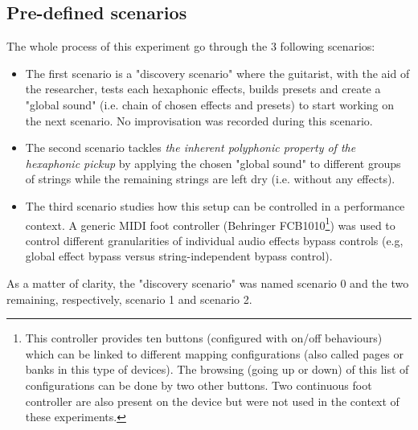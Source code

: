 \documentclass{article}
\begin{document}
\subsection{Pre-defined scenarios}
The whole process of this experiment go through the 3 following scenarios:
\begin{itemize}
    \item The first scenario is a "discovery scenario" where the guitarist, with the aid of the researcher, tests each hexaphonic effects, builds presets and create a "global sound" (i.e. chain of chosen effects and presets) to start working on the next scenario. No improvisation was recorded during this scenario.  
    
    \item The second scenario tackles \textit{the inherent polyphonic property of the hexaphonic pickup} by applying the chosen "global sound" to different groups of strings while the remaining strings are left dry (i.e. without any effects).
    
    \item The third scenario studies how this setup can be controlled in a performance context. A generic MIDI foot controller (Behringer FCB1010\footnote{\label{foot:Behringer1010}This controller provides ten buttons (configured with on/off behaviours) which can be linked to different mapping configurations (also called pages or banks in this type of devices). The browsing (going up or down) of this list of configurations can be done by two other buttons. Two continuous foot controller are also present on the device but were not used in the context of these experiments.}) was used to control different granularities of individual audio effects bypass controls (e.g, global effect bypass versus string-independent bypass control). 
\end{itemize} 
As a matter of clarity, the "discovery scenario" was named scenario 0 and the two remaining, respectively, scenario 1 and scenario 2.
\end{document}
